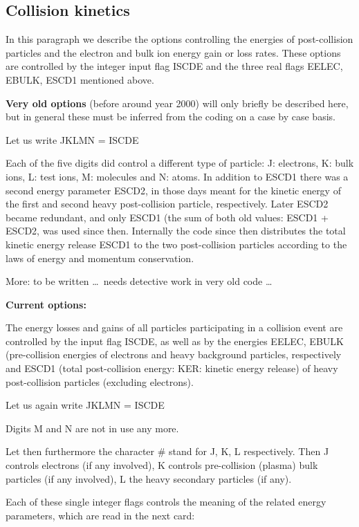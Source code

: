 \subsection{Collision kinetics}

In this paragraph we describe the options controlling the energies of
post-collision particles and the electron and bulk ion energy gain or loss
rates.
These options are controlled by the integer input flag ISCDE and the three real
flags EELEC, EBULK, ESCD1 mentioned above.

\textbf{Very old options} (before around year 2000) will only briefly be
described here, but in general these must be inferred from the coding on a case
by case basis.

Let us write JKLMN = ISCDE 

Each of the five digits did control a different type of particle: J: electrons,
K: bulk ions, L: test ions, M: molecules and N: atoms.
In addition to ESCD1 there was a second energy parameter ESCD2, in those days
meant for the kinetic energy of the first and second heavy post-collision
particle, respectively.
Later ESCD2 became redundant, and only ESCD1 (the sum of both old values: ESCD1
+ ESCD2,	was used since then.
Internally the code since then distributes the total kinetic energy release
ESCD1 to the two post-collision particles according to the laws of energy and
momentum conservation.

More: to be written \dots\ needs detective work in very old code \dots

\textbf{Current options:} 

The energy losses and gains of all particles participating in a collision event
are controlled by the input flag ISCDE, as well as by the energies EELEC, EBULK
(pre-collision energies of electrons and heavy background particles,
respectively and ESCD1 (total post-collision energy: KER: kinetic energy
release) of heavy post-collision particles (excluding electrons).

Let us again write JKLMN = ISCDE 

Digits M and N are not in use any more.

Let then furthermore the character \# stand for J, K, L respectively.
Then J controls electrons (if any involved), K controls pre-collision (plasma)
bulk particles (if any involved), L the heavy secondary particles (if any).

Each of these single integer flags controls the meaning of the related energy
parameters, which are read in the next card:

